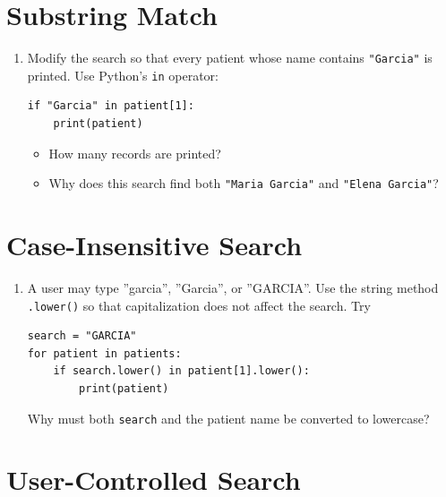 \documentclass{article}
\begin{document}
\section{Substring Match}

\begin{enumerate}

\item Modify the search so that every patient whose name contains \verb+"Garcia"+ is printed.  Use Python's \texttt{in} operator:

\begin{verbatim}
if "Garcia" in patient[1]:
    print(patient)
\end{verbatim}

\begin{itemize}

\item How many records are printed?

\item Why does this search find both \texttt{"Maria Garcia"} and \texttt{"Elena Garcia"}?

\end{itemize}

\end{enumerate}


\section{Case-Insensitive Search}

\begin{enumerate}

\item A user may type ''garcia'', ''Garcia'', or ''GARCIA''.  Use the string method \verb+.lower()+ so that capitalization does not affect the search. Try

\begin{verbatim}
search = "GARCIA"
for patient in patients:
    if search.lower() in patient[1].lower():
		print(patient)
\end{verbatim}

Why must both \texttt{search} and the patient name be converted to lowercase?

\end{enumerate}

\section{User-Controlled Search}
\end{document}
